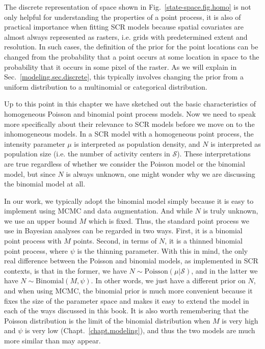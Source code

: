 The discrete representation of space shown in
Fig.~\ref{state-space.fig.homo} is not only helpful for understanding
the properties of a point process, it is also of practical importance
when fitting SCR models because spatial covariates are almost always
represented as rasters, i.e. grids with predetermined extent and
resolution. In such cases, the definition of the prior for
the point locations can be changed from the probability that a point
occurs at some location in space to the probability that it occurs in
some pixel of the raster. As we will explain in
Sec.~\ref{modeling.sec.discrete}, this typically involves changing the
prior from a uniform distribution to a multinomial or categorical
distribution.

Up to this point in this chapter we have sketched out the basic characteristics
of homogeneous Poisson and binomial point process models. Now we need
to speak more specifically about their relevance to SCR models before we move on
to the inhomogeneous models. %
In a SCR model with a homogeneous point process, the intensity
parameter $\mu$ is interpreted as population density, and $N$ is
interpreted as population size (i.e. the
  number of activity centers in $\mathcal{S}$). These interpretations
are true regardless of whether we consider the
Poisson model or the binomial model, but since $N$ is always unknown, one
might wonder why we are discussing the binomial model at all. %

In our work, we typically adopt the binomial model simply
because it is easy to implement using MCMC and data
augmentation. And while $N$ is truly unknown, we use an upper bound $M$
which is fixed. Thus, the standard point process we use in Bayesian
analyses can be
regarded in two ways. First, it is a binomial point process with $M$
points. Second, in terms of $N$, it is a thinned binomial point
process, where $\psi$ is the thinning parameter.
With this in mind,
the only real difference between the Poisson and binomial models, as
implemented in SCR contexts, is that in the former, we have
$N \sim \text{Poisson}(\mu|\mathcal{S})$, and in the latter we have
$N \sim \text{Binomial}(M, \psi)$. In other words, we just have a
different prior on $N$, and when using MCMC, the binomial prior is
much more convenient because it fixes the size of the parameter space
and makes it easy to extend the model in each of the ways discussed in
this book. It is also worth remembering that the Poisson
distribution is the limit of the binomial distribution when $M$ is
very high and $\psi$ is very low (Chapt.~\ref{chapt.modeling}), and
thus the two models are much more similar than may appear.

